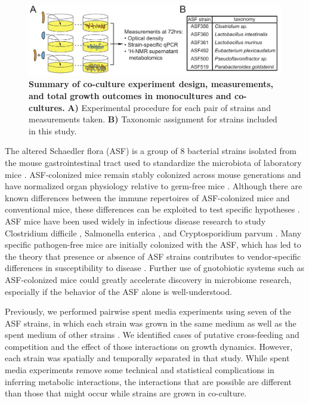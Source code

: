\documentclass[11pt,twocolumn,notitlepage,openany,twoside]{book}
\begin{document}
\begin{refsection}
\begin{figure}[tb]
\centering
\includegraphics[width=\textwidth]{ch2_fig1}
\caption[Summary of co-culture experiment design, measurements, and total growth outcomes in monocultures and co-cultures.]{\textbf{Summary of co-culture experiment design, measurements, and total growth outcomes in monocultures and co-cultures.} \textbf{A)} Experimental procedure for each pair of strains and measurements taken. \textbf{B)} Taxonomic assignment for strains included in this study.}
\end{figure}

The altered Schaedler flora (ASF) is a group of 8 bacterial strains isolated from the mouse gastrointestinal tract used to standardize the microbiota of laboratory mice \cite{Wymore_Brand2015-ez}. ASF-colonized mice remain stably colonized across mouse generations and have normalized organ physiology relative to germ-free mice \cite{Wymore_Brand2015-ez}. Although there are known differences between the immune repertoires of ASF-colonized mice and conventional mice, these differences can be exploited to test specific hypotheses \cite{Geuking2011-fj,Ivanov2009-vl}. ASF mice have been used widely in infectious disease research to study Clostridium difficile \cite{Schwan2009-zo}, Salmonella enterica \cite{Brugiroux2016-vi}, and Cryptosporidium parvum \cite{Harp1992-wr}. Many specific pathogen-free mice are initially colonized with the ASF, which has led to the theory that presence or absence of ASF strains contributes to vendor-specific differences in susceptibility to disease \cite{Singer2000-tr}.  Further use of gnotobiotic systems such as ASF-colonized mice could greatly accelerate discovery in microbiome research, especially if the behavior of the ASF alone is well-understood.

Previously, we performed pairwise spent media experiments using seven of the ASF strains, in which each strain was grown in the same medium as well as the spent medium of other strains \cite{Biggs2017-fs}. We identified cases of putative cross-feeding and competition and the effect of those interactions on growth dynamics. However, each strain was spatially and temporally separated in that study. While spent media experiments remove some technical and statistical complications in inferring metabolic interactions, the interactions that are possible are different than those that might occur while strains are grown in co-culture.


\end{refsection}
\end{document}
